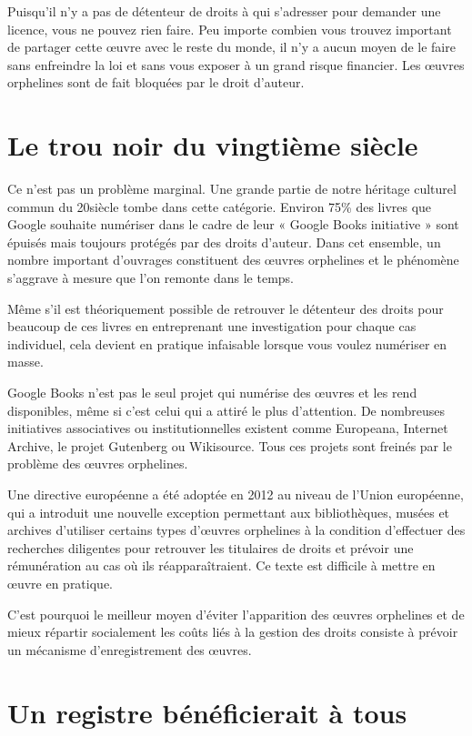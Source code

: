Puisqu’il n’y a pas de détenteur de droits à qui s’adresser pour demander une licence, vous ne
pouvez rien faire. Peu importe combien vous trouvez important de partager cette œuvre avec le reste
du monde, il n’y a aucun moyen de le faire sans enfreindre la loi et sans vous exposer à un grand
risque financier. Les œuvres orphelines sont de fait bloquées par le droit d’auteur.

\section{Le trou noir du vingtième siècle}

Ce n’est pas un problème marginal. Une grande partie de notre héritage culturel commun du 20siècle tombe dans cette catégorie. Environ 75\% des livres que Google souhaite numériser dans le cadre de leur « Google Books initiative » sont épuisés mais toujours protégés par des droits d’auteur. Dans cet ensemble, un nombre important d'ouvrages constituent des œuvres orphelines et le phénomène s'aggrave à mesure que l'on remonte dans le temps.

Même s’il est théoriquement possible de retrouver le détenteur des droits pour beaucoup de ces
livres en entreprenant une investigation pour chaque cas individuel, cela devient en pratique
infaisable lorsque vous voulez numériser en masse.

Google Books n’est pas le seul projet qui numérise des œuvres et les rend disponibles, même si c’est celui qui a attiré le plus d’attention. De nombreuses initiatives associatives ou institutionnelles existent comme Europeana, Internet Archive, le projet Gutenberg ou Wikisource. Tous ces projets sont freinés par le problème des œuvres orphelines.

Une directive européenne a été adoptée en 2012 au niveau de l'Union européenne, qui a introduit une nouvelle exception permettant aux bibliothèques, musées et archives d'utiliser certains types d'œuvres orphelines à la condition d'effectuer des recherches diligentes pour retrouver les titulaires de droits et prévoir une rémunération au cas où ils réapparaîtraient. Ce texte est difficile à mettre en œuvre en pratique. 

C'est pourquoi le meilleur moyen d'éviter l'apparition des œuvres orphelines et de mieux répartir socialement les coûts liés à la gestion des droits consiste à prévoir un mécanisme d'enregistrement des œuvres.  

\section{Un registre bénéficierait à tous}

